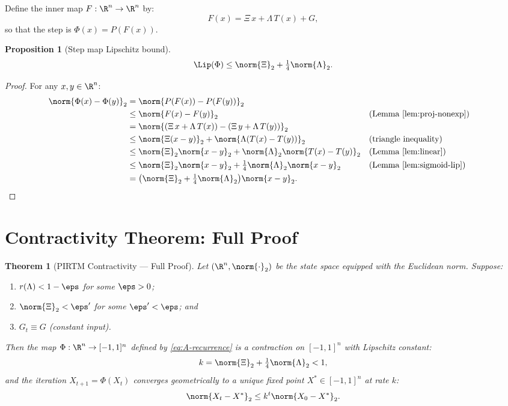 \documentclass[11pt,letterpaper]{article}
\theoremstyle{pirtmthm}
\newtheorem{theorem}{Theorem}[section]
\newtheorem{proposition}{Proposition}[section]
\theoremstyle{remark}
\begin{document}
Define the inner map $F : \R^n \to \R^n$ by:
\[
  F(x) = \Xi\, x + \Lambda\, T(x) + G,
\]
so that the step is $\Phi(x) = P(F(x))$.

\begin{proposition}[Step map Lipschitz bound]
\label{prop:step-lip}
\[
  \Lip(\Phi) \leq \norm{\Xi}_2 + \tfrac{1}{4}\norm{\Lambda}_2.
\]
\end{proposition}

\begin{proof}
For any $x, y \in \R^n$:
\begin{align*}
  \norm{\Phi(x) - \Phi(y)}_2
  &= \norm{P(F(x)) - P(F(y))}_2 \\
  &\leq \norm{F(x) - F(y)}_2
    && \text{(Lemma~\ref{lem:proj-nonexp})} \\
  &= \norm{(\Xi\,x + \Lambda\,T(x)) - (\Xi\,y + \Lambda\,T(y))}_2 \\
  &\leq \norm{\Xi(x-y)}_2 + \norm{\Lambda(T(x)-T(y))}_2
    && \text{(triangle inequality)} \\
  &\leq \norm{\Xi}_2\norm{x-y}_2 + \norm{\Lambda}_2\norm{T(x)-T(y)}_2
    && \text{(Lemma~\ref{lem:linear})} \\
  &\leq \norm{\Xi}_2\norm{x-y}_2 + \tfrac{1}{4}\norm{\Lambda}_2\norm{x-y}_2
    && \text{(Lemma~\ref{lem:sigmoid-lip})} \\
  &= \bigl(\norm{\Xi}_2 + \tfrac{1}{4}\norm{\Lambda}_2\bigr)\norm{x-y}_2. \qedhere
\end{align*}
\end{proof}

\section{Contractivity Theorem: Full Proof}
\label{sec:contractivity}

\begin{theorem}[PIRTM Contractivity --- Full Proof]
\label{thm:A-contractivity}
Let $(\R^n, \norm{\cdot}_2)$ be the state space equipped with the
Euclidean norm. Suppose:
\begin{enumerate}[label=(\roman*)]
  \item $r(\Lambda) < 1 - \eps$ for some $\eps > 0$;
  \item $\norm{\Xi}_2 < \eps'$ for some $\eps' < \eps$; and
  \item $G_t \equiv G$ (constant input).
\end{enumerate}
Then the map $\Phi : \R^n \to [-1,1]^n$ defined by \eqref{eq:A-recurrence}
is a contraction on $[-1,1]^n$ with Lipschitz constant:
\[
  k = \norm{\Xi}_2 + \tfrac{1}{4}\norm{\Lambda}_2 < 1,
\]
and the iteration $X_{t+1} = \Phi(X_t)$ converges geometrically to
a unique fixed point $X^* \in [-1,1]^n$ at rate $k$:
\[
  \norm{X_t - X^*}_2 \leq k^t \norm{X_0 - X^*}_2.
\]
\end{theorem}
\end{document}
